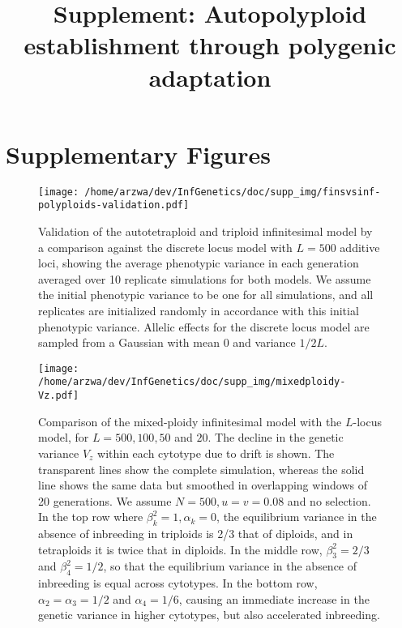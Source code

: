 \documentclass[11pt,a4paper]{article}
\begin{document}
\title{Supplement: Autopolyploid establishment through polygenic adaptation}
\author{}
\date{\vspace{-5ex}}
\maketitle
\tableofcontents
\clearpage

\section{Supplementary Figures}

\begin{figure}[H]
\centering
\texttt{[image: /home/arzwa/dev/InfGenetics/doc/supp\_img/finsvsinf-polyploids-validation.pdf]}
\caption{
Validation of the autotetraploid and triploid infinitesimal model by a
comparison against the discrete locus model with $L=500$ additive loci, showing
the average phenotypic variance in each generation averaged over 10 replicate
simulations for both models.
We assume the initial phenotypic variance to be one for all simulations, and
all replicates are initialized randomly in accordance with this initial
phenotypic variance.
Allelic effects for the discrete locus model are sampled from a Gaussian with
mean $0$ and variance $1/2L$.
\label{fig:fininf}}
\end{figure}

\begin{figure}[H]
\centering
\texttt{[image: /home/arzwa/dev/InfGenetics/doc/supp\_img/mixedploidy-Vz.pdf]}
\caption{Comparison of the mixed-ploidy infinitesimal model with the
\(L\)-locus model, for \(L=500,100,50\) and \(20\). The decline in the
genetic variance \(V_z\) within each cytotype due to drift is shown. The
transparent lines show the complete simulation, whereas the solid line
shows the same data but smoothed in overlapping windows of 20
generations. We assume \(N=500, u=v=0.08\) and no selection. In the top
row where \(\beta_k^2=1, \alpha_k=0\), the equilibrium variance in the
absence of inbreeding in triploids is 2/3 that of diploids, and in
tetraploids it is twice that in diploids. In the middle row,
\(\beta_3^2=2/3\) and \(\beta_4^2=1/2\), so that the equilibrium
variance in the absence of inbreeding is equal across cytotypes. In the
bottom row, \(\alpha_2= \alpha_3 =1/2\) and \(\alpha_4=1/6\), causing an
immediate increase in the genetic variance in higher cytotypes, but also
accelerated inbreeding. \label{fig:vz}}
\end{figure}
\end{document}
